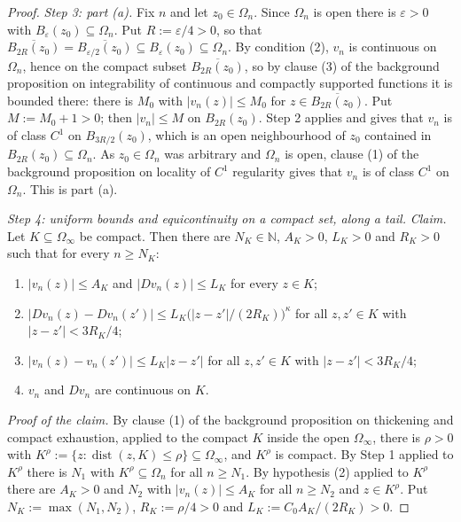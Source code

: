 \begin{proof}
\medskip\noindent\emph{Step 3: part (a).}
Fix $n$ and let $z_0\in\Omega_n$.  Since $\Omega_n$ is open there is $\varepsilon>0$ with
$B_\varepsilon(z_0)\subseteq\Omega_n$.  Put $R:=\varepsilon/4>0$, so that
$\overline{B_{2R}(z_0)}=\overline{B_{\varepsilon/2}(z_0)}\subseteq B_\varepsilon(z_0)\subseteq\Omega_n$.
By condition (2), $v_n$ is continuous on $\Omega_n$, hence on the compact subset
$\overline{B_{2R}(z_0)}$, so by clause (3) of the background proposition on integrability of
continuous and compactly supported functions it is bounded there: there is $M_0$ with
$\lvert v_n(z)\rvert\le M_0$ for $z\in\overline{B_{2R}(z_0)}$.  Put $M:=M_0+1>0$; then
$\lvert v_n\rvert\le M$ on $B_{2R}(z_0)$.  Step 2 applies and gives that $v_n$ is of class
$C^{1}$ on $B_{3R/2}(z_0)$, which is an open neighbourhood of $z_0$ contained in
$B_{2R}(z_0)\subseteq\Omega_n$.  As $z_0\in\Omega_n$ was arbitrary and $\Omega_n$ is open,
clause (1) of the background proposition on locality of $C^{1}$ regularity gives that $v_n$ is
of class $C^{1}$ on $\Omega_n$.  This is part (a).

\medskip\noindent\emph{Step 4: uniform bounds and equicontinuity on a compact set, along a
tail.}
\emph{Claim.}  Let $K\subseteq\Omega_\infty$ be compact.  Then there are $N_K\in\mathbb{N}$,
$A_K>0$, $L_K>0$ and $R_K>0$ such that for every $n\ge N_K$:
\begin{enumerate}
\item[(i)] $\lvert v_n(z)\rvert\le A_K$ and $\lvert Dv_n(z)\rvert\le L_K$ for every $z\in K$;
\item[(ii)] $\lvert Dv_n(z)-Dv_n(z')\rvert\le L_K\bigl(\lvert z-z'\rvert/(2R_K)\bigr)^{\kappa}$
for all $z,z'\in K$ with $\lvert z-z'\rvert<3R_K/4$;
\item[(iii)] $\lvert v_n(z)-v_n(z')\rvert\le L_K\lvert z-z'\rvert$ for all $z,z'\in K$ with
$\lvert z-z'\rvert<3R_K/4$;
\item[(iv)] $v_n$ and $Dv_n$ are continuous on $K$.
\end{enumerate}

\emph{Proof of the claim.}  By clause (1) of the background proposition on thickening and
compact exhaustion, applied to the compact $K$ inside the open $\Omega_\infty$, there is
$\rho>0$ with $K^{\rho}:=\{z:\operatorname{dist}(z,K)\le\rho\}\subseteq\Omega_\infty$, and
$K^{\rho}$ is compact.  By Step 1 applied to $K^{\rho}$ there is $N_1$ with
$K^{\rho}\subseteq\Omega_n$ for all $n\ge N_1$.  By hypothesis (2) applied to $K^{\rho}$ there
are $A_K>0$ and $N_2$ with $\lvert v_n(z)\rvert\le A_K$ for all $n\ge N_2$ and
$z\in K^{\rho}$.  Put $N_K:=\max(N_1,N_2)$, $R_K:=\rho/4>0$ and $L_K:=C_0A_K/(2R_K)>0$.


\end{proof}
